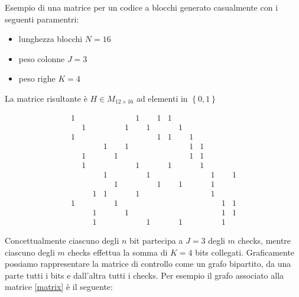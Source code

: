 	Esempio di una matrice per un codice a blocchi generato casualmente con i seguenti paramentri:
	
	\begin{itemize}
		\item lunghezza blocchi $N = 16$
		\item peso colonne $J  = 3$
		\item peso righe $K = 4$
	\end {itemize}
	La matrice risultante è $H \in M_{12 \times 16}$ ad elementi in $\left\{0,1\right\}$
	
	\begin{equation} \label{matrix}
		\begin{smallmatrix}
			1& & & & & &1& &1&1& & & & & &  \\
			 &1& & & &1& &1& & &1& & & & &  \\
			1& & & & & & & &1&1& &1& & & &  \\
			 & & &1& &1& & & & & &1&1& & &  \\
			 &1& & &1& & & & & & &1&1& & &  \\
			 &1& & & & &1& & &1& & &1& & &  \\
			 & & &1& & & &1& & & & & &1& &1 \\
			 & & & &1& & & &1& &1& & &1& &  \\
			 & &1&1& & &1& & & & & & &1& &  \\
			1& & & &1& & & & & & & & & &1&1 \\
			 & &1& & &1& & & & & & & & &1&1 \\
			 & &1& & & & &1& & &1& & & &1& 
		\end{smallmatrix}
	\end{equation}
	
	Concettualmente ciascuno degli $n$ bit partecipa a $J = 3$ degli $m$ checks, mentre ciascuno degli $m$ checks effettua la somma di $K = 4$ bits collegati.
	Graficamente possiamo rappresentare la matrice di controllo come un grafo bipartito, da una parte tutti i bits e dall'altra tutti i checks. Per esempio il grafo associato alla matrice \ref{matrix} è il seguente:
	
